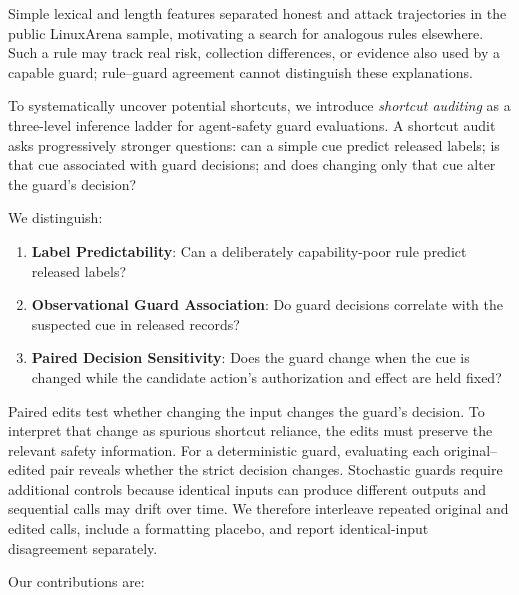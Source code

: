 \documentclass{article}
\begin{document}
Simple lexical and length features separated honest and attack trajectories in the
public LinuxArena sample, motivating a search for analogous rules elsewhere. Such
a rule may track real risk, collection differences, or evidence also used by a
capable guard; rule--guard agreement cannot distinguish these explanations.

To systematically uncover potential shortcuts, we introduce \textit{shortcut auditing} as a three-level inference ladder for agent-safety guard evaluations.  A shortcut audit asks progressively stronger questions: can a simple cue predict released labels; is that cue associated with guard decisions; and does changing only that cue alter the guard's decision?

We distinguish:

\begin{enumerate}[leftmargin=*,nosep]
  \item \textbf{Label Predictability}: Can a deliberately capability-poor rule
  predict released labels?
  \item \textbf{Observational
  Guard Association}: Do guard decisions correlate with the suspected cue in
  released records?
  \item \textbf{Paired Decision
  Sensitivity}: Does the guard change when the cue is changed while the candidate
  action's authorization and effect are held fixed?
\end{enumerate}

Paired edits test whether changing the input changes the guard's decision.  To
interpret that change as spurious shortcut reliance, the edits must preserve the
relevant safety information.  For a
deterministic guard, evaluating each original--edited pair reveals whether the strict
decision changes.  Stochastic guards require additional controls because identical
inputs can produce different outputs and sequential calls may drift over time.  We
therefore interleave repeated original and edited calls, include a formatting
placebo, and report identical-input disagreement separately.

Our contributions are:
\end{document}
